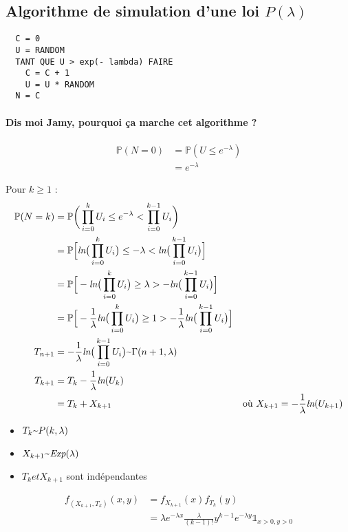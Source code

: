 \documentclass{article}
\newcommand{\textapprox}{\raisebox{0.5ex}{\texttildelow}}
\begin{document}
\subsection{Algorithme de simulation d'une loi $P(\lambda)$}
\begin{verbatim}
  C = 0
  U = RANDOM
  TANT QUE U > exp(- lambda) FAIRE
    C = C + 1
    U = U * RANDOM
  N = C
\end{verbatim}

\paragraph{Dis moi Jamy, pourquoi ça marche cet algorithme ?}
\begin{align*}
  \mathbb{P}(N = 0) &= \mathbb{P}(U \leq e^{- \lambda}) \\
  &= e^{- \lambda}
\end{align*}

Pour $k \geq 1$ :
\begin{align*}
  \mathbb{P}(N=k) &= \mathbb{P}\bigg(\prod_{i=0}^k U_i \leq e^{- \lambda} < \prod_{i=0}^{k-1}U_i\bigg) \\
  &= \mathbb{P}\Big[ \textit{ln}\big(\prod_{i=0}^k U_i \big) \leq - \lambda < \textit{ln}\big(\prod_{i=0}^{k-1}U_i \big) \Big] \\
  &= \mathbb{P}\Big[ -\textit{ln}\big(\prod_{i=0}^k U_i \big) \geq  \lambda > -\textit{ln}\big(\prod_{i=0}^{k-1}U_i \big) \Big] \\
  &= \mathbb{P}\Big[ -\frac{1}{\lambda}\textit{ln}\big(\prod_{i=0}^k U_i \big) \geq  1 > -\frac{1}{\lambda}\textit{ln}\big(\prod_{i=0}^{k-1}U_i \big) \Big] \\
  T_{n+1} &= -\frac{1}{\lambda}\textit{ln}\big(\prod_{i=0}^{k-1}U_i \big) \textapprox \Gamma (n+1, \lambda) \\
  T_{k+1} &= T_k - \frac{1}{\lambda} \textit{ln}(U_k) \\
  &= T_k + X_{k+1} & \text{où } X_{k+1} = - \frac{1}{\lambda} \textit{ln}(U_{k+1})
\end{align*}

\begin{itemize}
  \item $T_{k} \textapprox P(k, \lambda)$
  \item $X_{k+1} \textapprox \textit{Exp}(\lambda)$
  \item $T_{k} et X_{k+1}$ sont indépendantes
\end{itemize}

\begin{align*}
  f_{(X_{k+1}, T_k)}(x,y) &= f_{X_{k+1}}(x)f_{T_k}(y) \\
  &= \lambda e^{- \lambda x} \frac{\lambda}{(k-1)!}y^{k-1}e^{- \lambda y} \mathds{1}_{x > 0, y > 0}
\end{align*}
\end{document}
